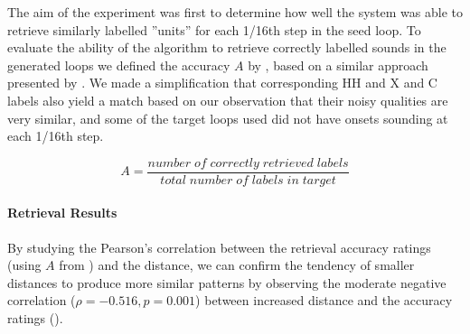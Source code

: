 The aim of the experiment was first to determine how well the system was able to retrieve similarly labelled  ”units” for each 1/16th step in the seed loop. To evaluate the ability of the algorithm to retrieve correctly labelled sounds in the generated loops we defined the accuracy $A$ by , based on a similar approach presented by \cite{Thompson2014}.  We made a simplification that corresponding HH and X and C labels also yield a match based on our observation that their noisy qualities are very similar, and some of the target loops used did not have onsets sounding at each 1/16th step.

\begin{equation}
\label{eq:accuracy}	
A = \frac{number\;of\;correctly\;retrieved\;labels}{total\;number\;of\;labels\;in\;target}
\end{equation}  

\paragraph{Retrieval Results}

By studying the Pearson's correlation between the retrieval accuracy ratings (using $A$ from ) and the distance, we can confirm the tendency of smaller distances to produce more similar patterns by observing the moderate negative correlation ($\rho = -0.516, p = 0.001$) between increased distance and the accuracy ratings ().

